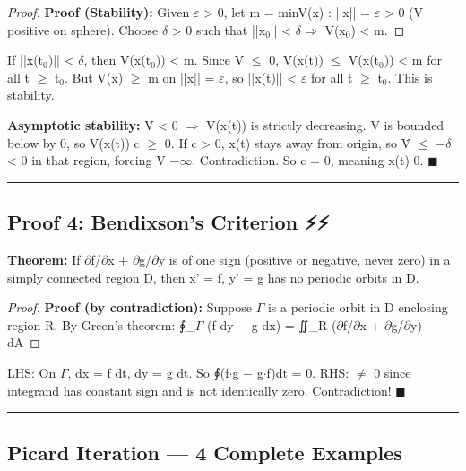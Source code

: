 \documentclass[12pt,a4paper,openany]{book}
\begin{document}
{{\begin{proof}
\textbf{Proof (Stability):}
Given $\varepsilon$ > 0, let m = min{V(x) : ||x|| = $\varepsilon$} > 0 (V positive on sphere).
Choose $\delta$ > 0 such that ||x$_0$|| < $\delta\Longrightarrow$ V(x$_0$) < m.
\end{proof}

If ||x(t$_0$)|| < $\delta$, then V(x(t$_0$)) < m. Since V̇ $\leq$ 0, V(x(t)) $\leq$ V(x(t$_0$)) < m for all t $\geq$ t$_0$.
But V(x) $\geq$ m on ||x|| = $\varepsilon$, so ||x(t)|| < $\varepsilon$ for all t $\geq$ t$_0$. This is stability.

\textbf{Asymptotic stability:} V̇ < 0 $\Longrightarrow$ V(x(t)) is strictly decreasing. V is bounded below by 0, so V(x(t))  c $\geq$ 0. If c > 0, x(t) stays away from origin, so V̇ $\leq$ −$\delta$ < 0 in that region, forcing V  −$\infty$. Contradiction. So c = 0, meaning x(t)  0. $\blacksquare$

\bigskip\noindent\rule{\textwidth}{0.4pt}\bigskip

\subsection{Proof 4: Bendixson's Criterion ⚡⚡}

\begin{tcolorbox}[colback=lightblue,colframe=thmblue,title=\textbf{Theorem},breakable,boxrule=1.5pt]
\textbf{Theorem:} If $\partial$f/$\partial$x + $\partial$g/$\partial$y is of one sign (positive or negative, never zero) in a simply connected region D, then x' = f, y' = g has no periodic orbits in D.
\end{tcolorbox}

\begin{proof}
\textbf{Proof (by contradiction):}
Suppose $\Gamma$ is a periodic orbit in D enclosing region R. By Green's theorem:
∮_$\Gamma$ (f dy − g dx) = ∬_R ($\partial$f/$\partial$x + $\partial$g/$\partial$y) dA
\end{proof}

LHS: On $\Gamma$, dx = f dt, dy = g dt. So ∮(f$\cdot$g − g$\cdot$f)dt = 0.
RHS: $\neq$ 0 since integrand has constant sign and is not identically zero.
Contradiction! $\blacksquare$

\bigskip\noindent\rule{\textwidth}{0.4pt}\bigskip


\subsection{Picard Iteration — 4 Complete Examples}

}}
\end{document}
